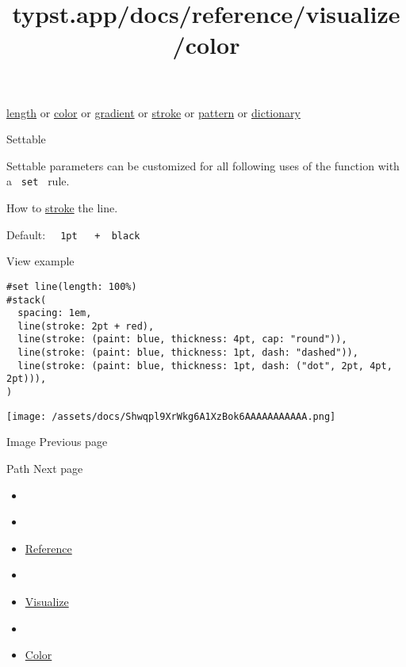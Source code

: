 \href{/docs/reference/layout/length/}{length} {or}
\href{/docs/reference/visualize/color/}{color} {or}
\href{/docs/reference/visualize/gradient/}{gradient} {or}
\href{/docs/reference/visualize/stroke/}{stroke} {or}
\href{/docs/reference/visualize/pattern/}{pattern} {or}
\href{/docs/reference/foundations/dictionary/}{dictionary}

{{ Settable }}

\label{parameters-stroke-settable-tooltip}
Settable parameters can be customized for all following uses of the
function with a \texttt{\ set\ } rule.

How to \href{/docs/reference/visualize/stroke/}{stroke} the line.

Default:
\texttt{\ }{\texttt{\ 1pt\ }}\texttt{\ }{\texttt{\ +\ }}\texttt{\ black\ }


View example

\begin{verbatim}
#set line(length: 100%)
#stack(
  spacing: 1em,
  line(stroke: 2pt + red),
  line(stroke: (paint: blue, thickness: 4pt, cap: "round")),
  line(stroke: (paint: blue, thickness: 1pt, dash: "dashed")),
  line(stroke: (paint: blue, thickness: 1pt, dash: ("dot", 2pt, 4pt, 2pt))),
)
\end{verbatim}

\texttt{[image: /assets/docs/Shwqpl9XrWkg6A1XzBok6AAAAAAAAAAA.png]}

\href{/docs/reference/visualize/image/}{\pandocbounded{}}

{ Image } { Previous page }

\href{/docs/reference/visualize/path/}{\pandocbounded{}}

{ Path } { Next page }


\title{typst.app/docs/reference/visualize/color}

\begin{itemize}
\tightlist
\item
  \href{/docs}{}
\item
  
\item
  \href{/docs/reference/}{Reference}
\item
  
\item
  \href{/docs/reference/visualize/}{Visualize}
\item
  
\item
  \href{/docs/reference/visualize/color/}{Color}
\end{itemize}

